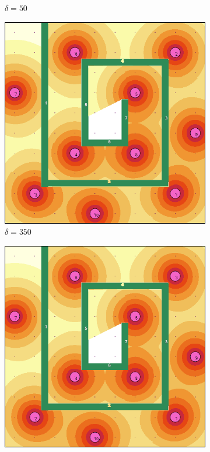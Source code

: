 \documentclass[letterpaper, 10 pt, conference]{ieeeconf}
\begin{document}
\begin{figure}[!t]
\begin{subfigure}[t]{0.30\columnwidth}
    \caption{$\delta = 50$}
\end{subfigure}%
\hfill
\begin{subfigure}[t]{0.30\columnwidth}
    \centering
    \includegraphics[width=\columnwidth]{Figures/MazeRange350.png}
    \caption{$\delta = 350$}
\end{subfigure}%
\hfill
\begin{subfigure}[t]{0.30\columnwidth}
    \centering
    \includegraphics[width=\columnwidth]{Figures/MazeRange800.png}

\end{subfigure}
\end{figure}
\end{document}
